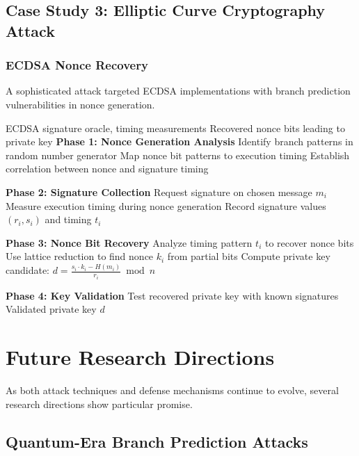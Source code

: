 \documentclass[11pt,a4paper]{article}
\theoremstyle{definition}
\begin{document}
\subsection{Case Study 3: Elliptic Curve Cryptography Attack}

\subsubsection{ECDSA Nonce Recovery}

A sophisticated attack targeted ECDSA implementations with branch prediction vulnerabilities in nonce generation.

\begin{algorithm}
\caption{ECDSA Nonce Recovery via Branch Prediction}
\begin{algorithmic}[1]
\REQUIRE ECDSA signature oracle, timing measurements
\ENSURE Recovered nonce bits leading to private key
\STATE \textbf{Phase 1: Nonce Generation Analysis}
\STATE Identify branch patterns in random number generator
\STATE Map nonce bit patterns to execution timing
\STATE Establish correlation between nonce and signature timing

\STATE \textbf{Phase 2: Signature Collection}
    \STATE Request signature on chosen message $m_i$
    \STATE Measure execution timing during nonce generation
    \STATE Record signature values $(r_i, s_i)$ and timing $t_i$
\ENDFOR

\STATE \textbf{Phase 3: Nonce Bit Recovery}
    \STATE Analyze timing pattern $t_i$ to recover nonce bits
    \STATE Use lattice reduction to find nonce $k_i$ from partial bits
    \STATE Compute private key candidate: $d = \frac{s_i \cdot k_i - H(m_i)}{r_i} \bmod n$
\ENDFOR

\STATE \textbf{Phase 4: Key Validation}
\STATE Test recovered private key with known signatures
\RETURN Validated private key $d$
\end{algorithmic}
\end{algorithm}

\section{Future Research Directions}

As both attack techniques and defense mechanisms continue to evolve, several research directions show particular promise.

\subsection{Quantum-Era Branch Prediction Attacks}
\end{document}
